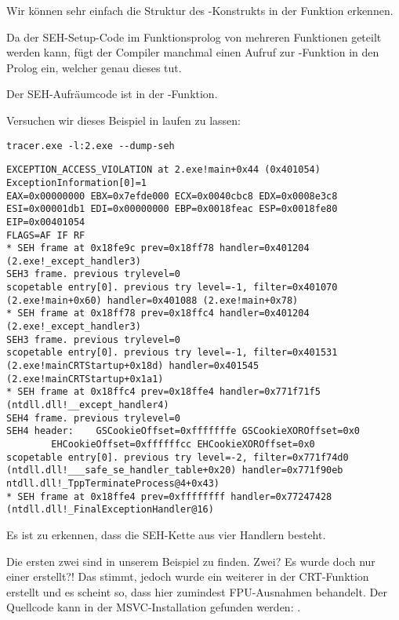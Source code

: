 Wir können sehr einfach die Struktur des -Konstrukts in der Funktion erkennen.

Da der SEH-Setup-Code im Funktionsprolog von mehreren Funktionen geteilt werden kann,
fügt der Compiler manchmal einen Aufruf zur -Funktion in den Prolog ein,
welcher genau dieses tut.

Der SEH-Aufräumcode ist in der -Funktion.

Versuchen wir dieses Beispiel in \tracer{} laufen zu lassen:

\begin{lstlisting}
tracer.exe -l:2.exe --dump-seh
\end{lstlisting}

\begin{lstlisting}[caption=tracer.exe output]
EXCEPTION_ACCESS_VIOLATION at 2.exe!main+0x44 (0x401054) ExceptionInformation[0]=1
EAX=0x00000000 EBX=0x7efde000 ECX=0x0040cbc8 EDX=0x0008e3c8
ESI=0x00001db1 EDI=0x00000000 EBP=0x0018feac ESP=0x0018fe80
EIP=0x00401054
FLAGS=AF IF RF
* SEH frame at 0x18fe9c prev=0x18ff78 handler=0x401204 (2.exe!_except_handler3)
SEH3 frame. previous trylevel=0
scopetable entry[0]. previous try level=-1, filter=0x401070 (2.exe!main+0x60) handler=0x401088 (2.exe!main+0x78)
* SEH frame at 0x18ff78 prev=0x18ffc4 handler=0x401204 (2.exe!_except_handler3)
SEH3 frame. previous trylevel=0
scopetable entry[0]. previous try level=-1, filter=0x401531 (2.exe!mainCRTStartup+0x18d) handler=0x401545 (2.exe!mainCRTStartup+0x1a1)
* SEH frame at 0x18ffc4 prev=0x18ffe4 handler=0x771f71f5 (ntdll.dll!__except_handler4)
SEH4 frame. previous trylevel=0
SEH4 header:	GSCookieOffset=0xfffffffe GSCookieXOROffset=0x0
		EHCookieOffset=0xffffffcc EHCookieXOROffset=0x0
scopetable entry[0]. previous try level=-2, filter=0x771f74d0 (ntdll.dll!___safe_se_handler_table+0x20) handler=0x771f90eb ntdll.dll!_TppTerminateProcess@4+0x43)
* SEH frame at 0x18ffe4 prev=0xffffffff handler=0x77247428 (ntdll.dll!_FinalExceptionHandler@16)
\end{lstlisting}

Es ist zu erkennen, dass die SEH-Kette aus vier Handlern besteht.

Die ersten zwei sind in unserem Beispiel zu finden. Zwei?
Es wurde doch nur einer erstellt?!
Das stimmt, jedoch wurde ein weiterer in der \ac{CRT}-Funktion 
erstellt und es scheint so, dass hier zumindest \ac{FPU}-Ausnahmen behandelt.
Der Quellcode kann in der MSVC-Installation gefunden werden: .


